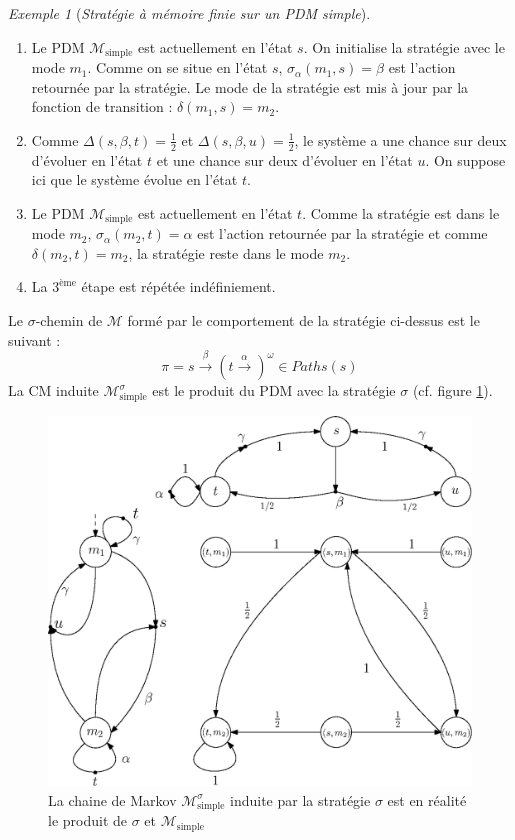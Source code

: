 \documentclass[12pt,a4paper]{report}
\theoremstyle{definition}%
\theoremstyle{remark}
\newtheorem{example}{Exemple}[chapter]
\begin{document}
\begin{example}[\textit{Stratégie à mémoire finie sur un PDM simple}]
\begin{enumerate}
 	\item Le PDM $\mathcal{M}_{\text{simple}}$ est actuellement en l'état $s$. On initialise la stratégie avec le mode $m_1$. Comme on se situe en l'état $s$, $\sigma_\alpha(m_1, s) = \beta$ est l'action retournée par la stratégie. Le mode de la stratégie est mis à jour par la fonction de transition : $\delta(m_1, s) = m_2$.
	\item Comme $\Delta(s, \beta, t) = \frac{1}{2}$ et $\Delta(s, \beta, u) = \frac{1}{2}$, le système a une chance sur deux d'évoluer en l'état $t$ et une chance sur deux d'évoluer en l'état $u$.
	On suppose ici que le système évolue en l'état $t$.
	\item Le PDM $\mathcal{M}_{\text{simple}}$ est actuellement en l'état $t$. Comme la stratégie est dans le mode $m_2$, $\sigma_\alpha(m_2, t) = \alpha$ est l'action retournée par la stratégie et comme $\delta(m_2, t) = m_2$, la stratégie reste dans le mode $m_2$.
	\item La $3^\text{ème}$ étape est répétée indéfiniement.
 \end{enumerate}
 Le $\sigma$-chemin de $\mathcal{M}$ formé par le comportement de la stratégie ci-dessus est le suivant :
 \[
 	\pi = s \xrightarrow{\beta} (t \xrightarrow{\alpha})^\omega \in Paths(s)
\]
La CM induite $\mathcal{M}^{\sigma}_{\text{simple}}$ est le produit du
PDM avec la stratégie $\sigma$ (cf. figure \ref{finite_s3}).
\begin{figure}[H]
\centering
\captionsetup{justification=centering}
\includegraphics[scale=0.6]{figures/finite_scheduer}
	\caption{La chaine de Markov $\mathcal{M}^\sigma_{\text{simple}}$ induite par
	la stratégie $\sigma$ est en réalité le produit de $\sigma$ et $\mathcal{M}_\text{simple}$}
	\label{finite_s3}
\end{figure}

\end{example}
\end{document}
